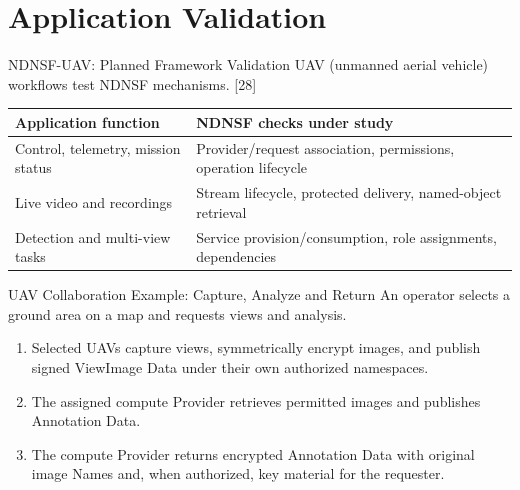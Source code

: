 \section{Application Validation}
\begin{frame}{NDNSF-UAV: Planned Framework Validation}
\small UAV (unmanned aerial vehicle) workflows test NDNSF mechanisms. [28]
\par\vspace{2mm}
\begin{tabularx}{\linewidth}{p{.37\linewidth}X}
\toprule Application function & NDNSF checks under study\\\midrule
Control, telemetry, mission status & Provider/request association, permissions, operation lifecycle\\\midrule
Live video and recordings & Stream lifecycle, protected delivery, named-object retrieval\\\midrule
Detection and multi-view tasks & Service provision/consumption, role assignments, dependencies\\\bottomrule
\end{tabularx}
\vspace{3mm}
\end{frame}

\begin{frame}{UAV Collaboration Example: Capture, Analyze and Return}
\small An operator selects a ground area on a map and requests views and analysis.
\begin{enumerate}
\item Selected UAVs capture views, symmetrically encrypt images, and publish signed ViewImage Data under their own authorized namespaces.
\item The assigned compute Provider retrieves permitted images and publishes Annotation Data.
\item The compute Provider returns encrypted Annotation Data with original image Names and, when authorized, key material for the requester.
\end{enumerate}
\vspace{2mm}
\end{frame}

